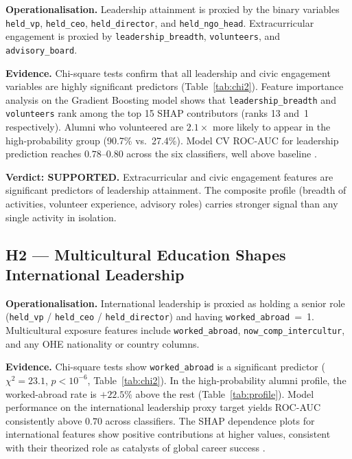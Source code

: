\documentclass[10pt,twocolumn]{article}
\begin{document}
\textbf{Operationalisation.} Leadership attainment is proxied by the binary
variables \texttt{held\_vp}, \texttt{held\_ceo}, \texttt{held\_director}, and
\texttt{held\_ngo\_head}. Extracurricular engagement is proxied by
\texttt{leadership\_breadth}, \texttt{volunteers}, and
\texttt{advisory\_board}.

\textbf{Evidence.} Chi-square tests confirm that all leadership and civic
engagement variables are highly significant predictors
(Table~\ref{tab:chi2}). Feature importance analysis on the Gradient Boosting
model shows that \texttt{leadership\_breadth} and \texttt{volunteers} rank
among the top 15 SHAP contributors (ranks 13 and~1 respectively). Alumni who
volunteered are $2.1\times$ more likely to appear in the high-probability group
(90.7\% vs.\ 27.4\%). Model CV ROC-AUC for leadership prediction reaches
$0.78$--$0.80$ across the six classifiers, well above baseline
\cite{binani2024, lamhour2026}.

\textbf{Verdict: SUPPORTED.} Extracurricular and civic engagement features
are significant predictors of leadership attainment. The composite profile
(breadth of activities, volunteer experience, advisory roles) carries stronger
signal than any single activity in isolation.

\subsection{H2 --- Multicultural Education Shapes International Leadership}

\textbf{Operationalisation.} International leadership is proxied as holding a
senior role (\texttt{held\_vp} / \texttt{held\_ceo} / \texttt{held\_director})
and having \texttt{worked\_abroad}~=~1. Multicultural exposure features include
\texttt{worked\_abroad}, \texttt{now\_comp\_intercultur}, and any OHE
nationality or country columns.

\textbf{Evidence.} Chi-square tests show \texttt{worked\_abroad} is a
significant predictor ($\chi^2 = 23.1$, $p < 10^{-6}$, Table~\ref{tab:chi2}).
In the high-probability alumni profile, the worked-abroad rate is $+22.5\%$
above the rest (Table~\ref{tab:profile}). Model performance on the international
leadership proxy target yields ROC-AUC consistently above $0.70$ across
classifiers. The SHAP dependence plots for international features show positive
contributions at higher values, consistent with their theorized role as
catalysts of global career success \cite{maltseva2022, udayar2025}.
\end{document}
